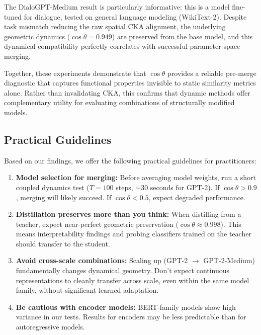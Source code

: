 \documentclass[10pt]{article} %
\theoremstyle{plain}
\theoremstyle{definition}
\theoremstyle{remark}
\begin{document}
The DialoGPT-Medium result is particularly informative: this is a model fine-tuned for dialogue, tested on general language modeling (WikiText-2). Despite task mismatch reducing the raw spatial CKA alignment, the underlying geometric dynamics ($\cos \theta = 0.949$) are preserved from the base model, and this dynamical compatibility perfectly correlates with successful parameter-space merging.

Together, these experiments demonstrate that $\cos \theta$ provides a reliable pre-merge diagnostic that captures functional properties invisible to static similarity metrics alone. Rather than invalidating CKA, this confirms that dynamic methods offer complementary utility for evaluating combinations of structurally modified models.

\subsection{Practical Guidelines}

Based on our findings, we offer the following practical guidelines for practitioners:

\begin{enumerate}
    \item \textbf{Model selection for merging:} Before averaging model weights, run a short coupled dynamics test ($T=100$ steps, $\sim$30 seconds for GPT-2). If $\cos \theta > 0.9$, merging will likely succeed. If $\cos \theta < 0.5$, expect degraded performance.
    
    \item \textbf{Distillation preserves more than you think:} When distilling from a teacher, expect near-perfect geometric preservation ($\cos \theta \approx 0.998$). This means interpretability findings and probing classifiers trained on the teacher should transfer to the student.
    
    \item \textbf{Avoid cross-scale combinations:} Scaling up (GPT-2 $\to$ GPT-2-Medium) fundamentally changes dynamical geometry. Don't expect continuous representations to cleanly transfer across scale, even within the same model family, without significant learned adaptation.
    
    \item \textbf{Be cautious with encoder models:} BERT-family models show high variance in our tests. Results for encoders may be less predictable than for autoregressive models.
\end{enumerate}
\end{document}
